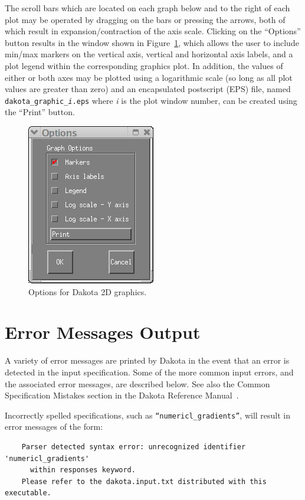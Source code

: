 The scroll bars which are located on each graph below and to the right
of each plot may be operated by dragging on the bars or pressing the
arrows, both of which result in expansion/contraction of the axis
scale. Clicking on the ``Options'' button results in the window shown
in Figure~\ref{output:2dcontoptions}, which allows the user to include
min/max markers on the vertical axis, vertical and horizontal axis
labels, and a plot legend within the corresponding graphics plot.  In
addition, the values of either or both axes may be plotted using a
logarithmic scale (so long as all plot values are greater than zero)
and an encapsulated postscript (EPS) file, named 
\texttt{dakota\_graphic\_\emph{i}.eps} where \emph{i} is the plot 
window number, can be created using the ``Print'' button.
\begin{figure}
\centering
\includegraphics[scale=0.6]{images/container_graphic_options}
\caption{Options for Dakota 2D graphics.}
\label{output:2dcontoptions}
\end{figure}


\section{Error Messages Output}\label{output:error}

A variety of error messages are printed by Dakota in the event that an
error is detected in the input specification. Some of the more common
input errors, and the associated error messages, are described below.
See also the Common Specification Mistakes section in the Dakota
Reference Manual~\cite{RefMan}.

Incorrectly spelled specifications, such as 
\texttt{``numericl\_gradients''}, will result in error messages of the form:
\begin{small}
\begin{verbatim}
    Parser detected syntax error: unrecognized identifier 'numericl_gradients'
      within responses keyword.
    Please refer to the dakota.input.txt distributed with this executable.
\end{verbatim}
\end{small}

